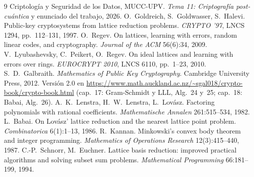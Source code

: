 {\small
\begin{thebibliography}{9}
\setlength{\itemsep}{0pt}
 Criptología y Seguridad de los Datos, MUCC-UPV. \emph{Tema 11: Criptografía
  post-cuántica} y enunciado del trabajo, 2026.
 O.~Goldreich, S.~Goldwasser, S.~Halevi. Public-key cryptosystems from lattice
  reduction problems. \emph{CRYPTO '97}, LNCS 1294, pp.~112--131, 1997.
 O.~Regev. On lattices, learning with errors, random linear codes, and
  cryptography. \emph{Journal of the ACM} 56(6):34, 2009.
 V.~Lyubashevsky, C.~Peikert, O.~Regev. On ideal lattices and learning with errors
  over rings. \emph{EUROCRYPT 2010}, LNCS 6110, pp.~1--23, 2010.
 S.~D.~Galbraith. \emph{Mathematics of Public Key Cryptography}.
  Cambridge University Press, 2012. Versión 2.0 en
  \url{https://www.math.auckland.ac.nz/~sgal018/crypto-book/crypto-book.html}
  (cap.~17: Gram-Schmidt y LLL, Alg.~24 y~25; cap.~18: Babai, Alg.~26).
 A.~K.~Lenstra, H.~W.~Lenstra, L.~Lovász. Factoring polynomials with rational
  coefficients. \emph{Mathematische Annalen} 261:515--534, 1982.
 L.~Babai. On Lovász' lattice reduction and the nearest lattice point problem.
  \emph{Combinatorica} 6(1):1--13, 1986.
 R.~Kannan. Minkowski's convex body theorem and integer programming.
  \emph{Mathematics of Operations Research} 12(3):415--440, 1987.
 C.-P.~Schnorr, M.~Euchner. Lattice basis reduction: improved practical algorithms
  and solving subset sum problems. \emph{Mathematical Programming} 66:181--199, 1994.
\end{thebibliography}}

